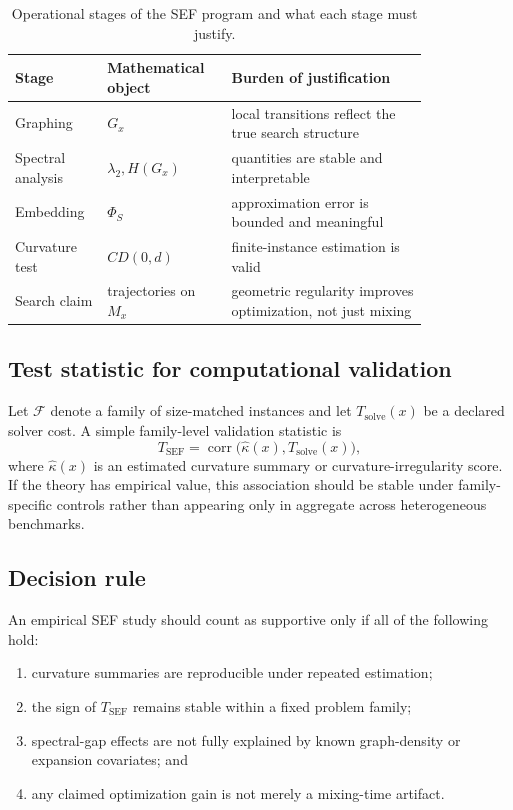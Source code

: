 \documentclass{svjour3}
\begin{document}
\begin{table}[t]
\centering
\caption{Operational stages of the SEF program and what each stage must justify.}
\label{tab:sef-stages}
\small
\begin{tabular}{@{}p{0.16\linewidth}p{0.24\linewidth}p{0.42\linewidth}@{}}
\toprule
Stage & Mathematical object & Burden of justification \\
\midrule
Graphing & $G_x$ & local transitions reflect the true search structure \\
Spectral analysis & $\lambda_2, H(G_x)$ & quantities are stable and interpretable \\
Embedding & $\Phi_S$ & approximation error is bounded and meaningful \\
Curvature test & $CD(0,d)$ & finite-instance estimation is valid \\
Search claim & trajectories on $M_x$ & geometric regularity improves optimization, not just mixing \\
\bottomrule
\end{tabular}
\end{table}

\subsection{Test statistic for computational validation}
Let $\mathcal{F}$ denote a family of size-matched instances and let $T_{\mathrm{solve}}(x)$ be a declared solver cost. A simple family-level validation statistic is
\[
T_{\mathrm{SEF}} = \operatorname{corr}\!\bigl(\widehat{\kappa}(x), T_{\mathrm{solve}}(x)\bigr),
\]
where $\widehat{\kappa}(x)$ is an estimated curvature summary or curvature-irregularity score. If the theory has empirical value, this association should be stable under family-specific controls rather than appearing only in aggregate across heterogeneous benchmarks.

\subsection{Decision rule}
An empirical SEF study should count as supportive only if all of the following hold:
\begin{enumerate}[leftmargin=*]
\item curvature summaries are reproducible under repeated estimation;
\item the sign of $T_{\mathrm{SEF}}$ remains stable within a fixed problem family;
\item spectral-gap effects are not fully explained by known graph-density or expansion covariates; and
\item any claimed optimization gain is not merely a mixing-time artifact.
\end{enumerate}
\end{document}
